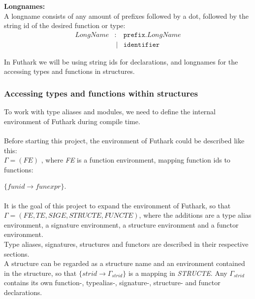 \begin{tcolorbox}
\textbf{Longnames:}\\
A longname consists of any amount of prefixes followed by a dot, followed by the
string id of the desired function or type:
\begin{align*}
LongName & :  & \texttt{prefix.}LongName \\
         &\ | & \texttt{identifier}
\end{align*}

In Futhark we will be using string ids for declarations, and longnames for
the accessing types and functions in structures.


\end{tcolorbox}
\subsubsection{Accessing types and functions within structures}
To work with type aliases and modules, we need to define the internal
environment of Futhark during compile time.\\
\\
Before starting this project, the environment of Futhark could be described like
this:\\
$\Gamma = (FE)$ , where \textit{FE} is a function environment, mapping function ids to functions:

 $\{funid \to funexpr\}$.
\\\\
It is the goal of this project to expand the environment of Futhark, so that\\[0.2em]
$\Gamma = (FE, TE, SIGE, STRUCTE, FUNCTE)$, where the additions are a type alias environment, a signature environment, a structure environment and a functor environment.\\[0.2em]
Type aliases, signatures, structures and functors are described in their respective
sections.\\
A structure can be regarded as a structure name and an environment contained in the structure, so that
$\{strid \to \Gamma_{strid}\}$ is a mapping in \textit{STRUCTE}.
\clearpage
Any $\Gamma_{strid}$ contains its own function-, typealias-, signature-, structure- and functor declarations.\\
\\

